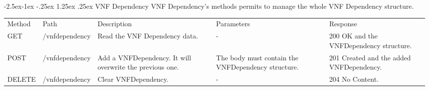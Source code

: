 \documentclass[11pt, english]{article}
\makeatletter
\renewcommand\paragraph{\@startsection{paragraph}{4}{\z@}%
            {-2.5ex\@plus -1ex \@minus -.25ex}%
            {1.25ex \@plus .25ex}%
            {\normalfont\normalsize\bfseries}}
\makeatother
\begin{document}
\newpage
\paragraph{VNF Dependency}
VNF Dependency's methods permits to manage the whole VNF Dependency structure. \\

\begin{tabular}{ |p{2cm}|m{3cm}|p{3cm}|p{3cm}|p{4cm}| }
    \hline
    \rowcolor{black} \multicolumn{5}{|c|}{\textcolor{white}{VNFDependency}} \\
    \hline
    \rowcolor{Gray}
    Method & Path & Description & Parameters & Response \\
    \hline
    GET   & /vnfdependency & Read the VNF Dependency data. & - & 200 OK and the VNFDependency structure. \\
    \hline
    POST & /vnfdependency & Add a VNFDependency. It will overwrite the previous one. & The body must contain the VNFDependency structure. & 201 Created and the added VNFDependency. \\
    \hline
    DELETE & /vnfdependency & Clear VNFDependency. & - & 204 No Content. \\
    \hline
\end{tabular}
\end{document}
